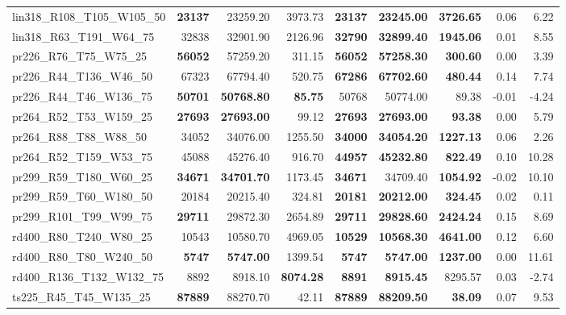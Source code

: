 \documentclass{singlecol-new}
\begin{document}
\begin{scriptsize}
\begin{longtable}{lrrrrrrrr}
		lin318\_R108\_T105\_W105\_50 & \textbf{23137} & 23259.20 & 3973.73 & \textbf{23137} & \textbf{23245.00} & \textbf{3726.65} & 0.06 & 6.22 \\
		lin318\_R63\_T191\_W64\_75 & 32838 & 32901.90 & 2126.96 & \textbf{32790} & \textbf{32899.40} & \textbf{1945.06} & 0.01 & 8.55 \\
		pr226\_R76\_T75\_W75\_25 & \textbf{56052} & 57259.20 & 311.15 & \textbf{56052} & \textbf{57258.30} & \textbf{300.60} & 0.00 & 3.39 \\
		pr226\_R44\_T136\_W46\_50 & 67323 & 67794.40 & 520.75 & \textbf{67286} & \textbf{67702.60} & \textbf{480.44} & 0.14 & 7.74 \\
		pr226\_R44\_T46\_W136\_75 & \textbf{50701} & \textbf{50768.80} & \textbf{85.75} & 50768 & 50774.00 & 89.38 & -0.01 & -4.24 \\
		pr264\_R52\_T53\_W159\_25 & \textbf{27693} & \textbf{27693.00} & 99.12 & \textbf{27693} & \textbf{27693.00} & \textbf{93.38} & 0.00 & 5.79 \\
		pr264\_R88\_T88\_W88\_50 & 34052 & 34076.00 & 1255.50 & \textbf{34000} & \textbf{34054.20} & \textbf{1227.13} & 0.06 & 2.26 \\
		pr264\_R52\_T159\_W53\_75 & 45088 & 45276.40 & 916.70 & \textbf{44957} & \textbf{45232.80} & \textbf{822.49} & 0.10 & 10.28 \\
		pr299\_R59\_T180\_W60\_25 & \textbf{34671} & \textbf{34701.70} & 1173.45 & \textbf{34671} & 34709.40 & \textbf{1054.92} & -0.02 & 10.10 \\
		pr299\_R59\_T60\_W180\_50 & 20184 & 20215.40 & 324.81 & \textbf{20181} & \textbf{20212.00} & \textbf{324.45} & 0.02 & 0.11 \\
		pr299\_R101\_T99\_W99\_75 & \textbf{29711} & 29872.30 & 2654.89 & \textbf{29711} & \textbf{29828.60} & \textbf{2424.24} & 0.15 & 8.69 \\
		rd400\_R80\_T240\_W80\_25 & 10543 & 10580.70 & 4969.05 & \textbf{10529} & \textbf{10568.30} & \textbf{4641.00} & 0.12 & 6.60 \\
		rd400\_R80\_T80\_W240\_50 & \textbf{5747} & \textbf{5747.00} & 1399.54 & \textbf{5747} & \textbf{5747.00} & \textbf{1237.00} & 0.00 & 11.61 \\
		rd400\_R136\_T132\_W132\_75 & 8892 & 8918.10 & \textbf{8074.28} & \textbf{8891} & \textbf{8915.45} & 8295.57 & 0.03 & -2.74 \\
		ts225\_R45\_T45\_W135\_25 & \textbf{87889} & 88270.70 & 42.11 & \textbf{87889} & \textbf{88209.50} & \textbf{38.09} & 0.07 & 9.53 \\

\end{longtable}
\end{scriptsize}
\end{document}
